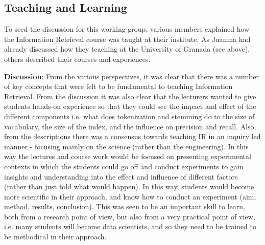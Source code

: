 \subsection{Teaching and Learning}
\label{sec:teaching}

To seed the discussion for this working group, various members explained how the Information Retrieval course was taught at their institute. As Juanma had already discussed how they teaching at the University of Granada (see above), others described their courses and experiences. 





\noindent
{\bf Discussion}:  From the various perspectives, it was clear that there was a number of key concepts that were felt to be fundamental to teaching Information Retrieval. From the discussion it was also clear that the lecturers wanted to give students hands-on experience so that they could see the impact and effect of the different components i.e. what does tokenization and stemming do to the size of vocabulary, the size of the index, and the influence on precision and recall. Also, from the descriptions there was a consensus towards teaching IR in an inquiry led manner - focusing mainly on the science (rather than the engineering). In this way the lectures and course work would be focused on presenting experimental contexts in which the students could go off and conduct experiments to gain insights and understanding into the effect and influence of different factors (rather than just told what would happen). In this way, students would become more scientific in their approach, and know how to conduct an experiment (aim, method, results, conclusion). This was seen to be an important skill to learn, both from a research point of view, but also from a very practical point of view, i.e. many students will become data scientists, and so they need to be trained to be methodical in their approach.

